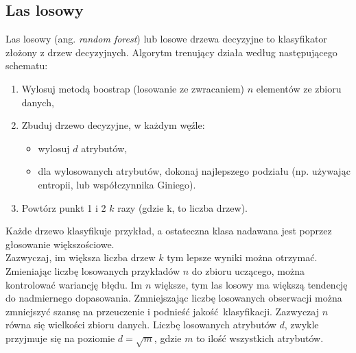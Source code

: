 \subsection{Las losowy}
Las losowy (ang. \textit{random forest}) lub losowe drzewa decyzyjne to klasyfikator złożony z drzew decyzyjnych. Algorytm trenujący działa według następującego schematu:
\begin{enumerate}
	\item Wylosuj metodą boostrap (losowanie ze zwracaniem) $n$ elementów ze zbioru danych,
	\item Zbuduj drzewo decyzyjne, w każdym węźle:
	\begin{itemize}
		\item wylosuj $d$ atrybutów,
		\item dla wylosowanych atrybutów, dokonaj najlepszego podziału (np. używając entropii, lub współczynnika Giniego).
	\end{itemize}
	\item Powtórz punkt 1 i 2 $k$ razy (gdzie k, to liczba drzew).
\end{enumerate}
Każde drzewo klasyfikuje przykład, a ostateczna klasa nadawana jest poprzez głosowanie większościowe. \\
Zazwyczaj, im większa liczba drzew $k$ tym lepsze wyniki można otrzymać. Zmieniając liczbę losowanych przykładów $n$ do zbioru uczącego, można kontrolować wariancję błędu. Im $n$ większe, tym las losowy ma większą tendencję do nadmiernego dopasowania. Zmniejszając liczbę losowanych obserwacji można zmniejszyć szansę na przeuczenie i podnieść jakość klasyfikacji. Zazwyczaj $n$ równa się wielkości zbioru danych. Liczbę losowanych atrybutów $d$, zwykle przyjmuje się na poziomie $d = \sqrt{m}$, gdzie $m$ to ilość wszystkich atrybutów.
